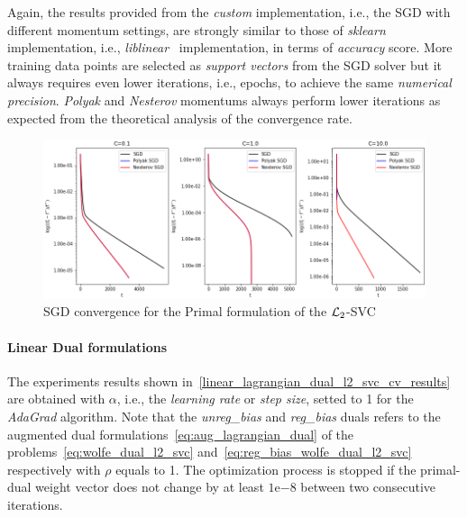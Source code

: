 

Again, the results provided from the \emph{custom} implementation, i.e., the SGD with different momentum settings, are strongly similar to those of \emph{sklearn} implementation, i.e., \emph{liblinear}~\cite{fan2008liblinear} implementation, in terms of \emph{accuracy} score. More training data points are selected as \emph{support vectors} from the SGD solver but it always requires even lower iterations, i.e., epochs, to achieve the same \emph{numerical precision}. \emph{Polyak} and \emph{Nesterov} momentums always perform lower iterations as expected from the theoretical analysis of the convergence rate.

\begin{figure}[H]
	\centering
	\includegraphics[scale=0.55]{img/l2_svc_loss_history}
	\caption{SGD convergence for the Primal formulation of the $\protect \mathcal{L}_2$-SVC}
	\label{fig:l2_svc_loss_history}
\end{figure}

\pagebreak

\paragraph{Linear Dual formulations}

The experiments results shown in~\ref{linear_lagrangian_dual_l2_svc_cv_results} are obtained with $\alpha$, i.e., the \emph{learning rate} or \emph{step size}, setted to 1 for the \emph{AdaGrad} algorithm. Note that the \emph{unreg\_bias} and \emph{reg\_bias} duals refers to the augmented dual formulations~\eqref{eq:aug_lagrangian_dual} of the problems~\eqref{eq:wolfe_dual_l2_svc} and~\eqref{eq:reg_bias_wolfe_dual_l2_svc} respectively with $\rho$ equals to 1. The optimization process is stopped if the primal-dual weight vector does not change by at least $1\mathrm{e}{-8}$  between two consecutive iterations.



